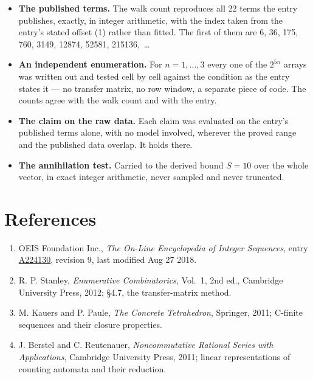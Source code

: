 \documentclass[11pt]{article}
\theoremstyle{definition}
\begin{document}
\begin{itemize}

\item {\bfseries The published terms.} The walk count reproduces all 22 terms the entry publishes, exactly, in integer arithmetic, with the index taken from the entry's stated offset (1) rather than fitted. The first of them are 6, 36, 175, 760, 3149, 12874, 52581, 215136,~\dots

\item {\bfseries An independent enumeration.} For $n = 1,\dots,3$ every one of the $2^{5n}$ arrays was written out and tested cell by cell against the condition as the entry states it --- no transfer matrix, no row window, a separate piece of code. The counts agree with the walk count and with the entry.

\item {\bfseries The claim on the raw data.} Each claim was evaluated on the entry's published terms alone, with no model involved, wherever the proved range and the published data overlap. It holds there.

\item {\bfseries The annihilation test.} Carried to the derived bound $S = 10$ over the whole vector, in exact integer arithmetic, never sampled and never truncated.

\end{itemize}

\section{References}

\begin{enumerate}

\item OEIS Foundation Inc., \emph{The On-Line Encyclopedia of Integer Sequences}, entry \href{https://oeis.org/A224130}{A224130}, revision 9, last modified Aug 27 2018.

\item R. P. Stanley, \emph{Enumerative Combinatorics}, Vol.~1, 2nd ed., Cambridge University Press, 2012; \S4.7, the transfer-matrix method.

\item M. Kauers and P. Paule, \emph{The Concrete Tetrahedron}, Springer, 2011; C-finite sequences and their closure properties.

\item J. Berstel and C. Reutenauer, \emph{Noncommutative Rational Series with Applications}, Cambridge University Press, 2011; linear representations of counting automata and their reduction.

\end{enumerate}
\end{document}
